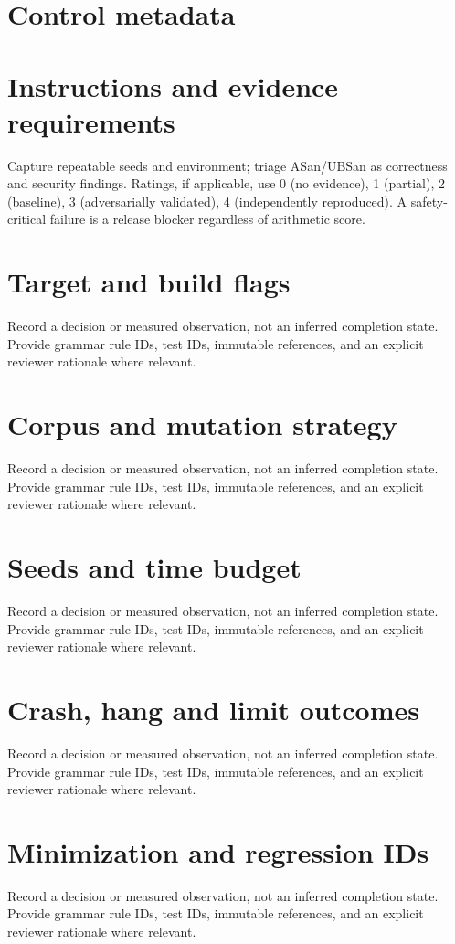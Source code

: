 \documentclass[11pt,letterpaper]{article}
\begin{document}
\makedoctitle\makedocsummary
\tableofcontents\clearpage
\section{Control metadata}
\section{Instructions and evidence requirements}
Capture repeatable seeds and environment; triage ASan/UBSan as correctness and security findings. Ratings, if applicable, use 0 (no evidence), 1 (partial), 2 (baseline), 3 (adversarially validated), 4 (independently reproduced). A safety-critical failure is a release blocker regardless of arithmetic score.
\section{Target and build flags}
Record a decision or measured observation, not an inferred completion state. Provide grammar rule IDs, test IDs, immutable references, and an explicit reviewer rationale where relevant.
\section{Corpus and mutation strategy}
Record a decision or measured observation, not an inferred completion state. Provide grammar rule IDs, test IDs, immutable references, and an explicit reviewer rationale where relevant.
\section{Seeds and time budget}
Record a decision or measured observation, not an inferred completion state. Provide grammar rule IDs, test IDs, immutable references, and an explicit reviewer rationale where relevant.
\section{Crash, hang and limit outcomes}
Record a decision or measured observation, not an inferred completion state. Provide grammar rule IDs, test IDs, immutable references, and an explicit reviewer rationale where relevant.
\section{Minimization and regression IDs}
Record a decision or measured observation, not an inferred completion state. Provide grammar rule IDs, test IDs, immutable references, and an explicit reviewer rationale where relevant.
\end{document}
